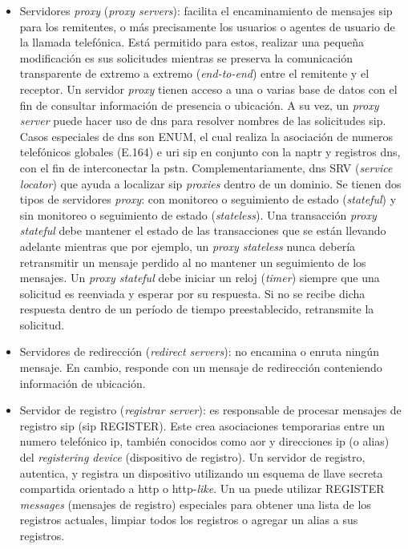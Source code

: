 \documentclass[a4paper,12pt]{report}
\begin{document}
\begin{itemize}
\item Servidores \emph{proxy} (\emph{proxy servers}):
facilita el encaminamiento de mensajes \ac{sip} para los
remitentes, o más precisamente los usuarios o agentes de usuario de la llamada
telefónica. Está permitido para estos, realizar una pequeña modificación es sus
solicitudes mientras se preserva la comunicación transparente de extremo a
extremo (\emph{end-to-end}) entre el remitente y el receptor. Un servidor \emph{proxy} tienen
acceso a una o varias base de datos con el fin de consultar información de
presencia o ubicación. A su vez, un \emph{proxy} \emph{server} puede hacer uso de \ac{dns} 
para resolver nombres de las solicitudes \ac{sip}. Casos especiales de
\ac{dns} son ENUM, el cual realiza la asociación de numeros telefónicos globales
(E.164) e \ac{uri} \ac{sip} en conjunto con la \ac{naptr} y registros \ac{dns}, con el fin de interconectar la \ac{pstn}.
Complementariamente, \ac{dns} SRV (\emph{service locator}) que ayuda a localizar \ac{sip} \emph{proxies} 
dentro de un dominio. 
Se tienen dos tipos de servidores \emph{proxy}: con monitoreo o seguimiento de estado
(\emph{stateful}) y sin monitoreo o seguimiento de estado (\emph{stateless}). Una transacción
\emph{proxy stateful} debe mantener el estado de las transacciones que se están
llevando adelante mientras que por ejemplo, un \emph{proxy stateless} nunca debería
retransmitir un mensaje perdido al no mantener un seguimiento de los mensajes.
Un \emph{proxy stateful} debe iniciar un reloj (\emph{timer}) siempre que una solicitud es
reenviada y esperar por su respuesta. Si no se recibe dicha respuesta dentro de
un período de tiempo preestablecido, retransmite la solicitud. 

\item Servidores de redirección (\emph{redirect servers}): no encamina o enruta ningún mensaje. En cambio,
responde con un mensaje de redirección conteniendo información de ubicación.

\item Servidor de registro (\emph{registrar server}):
es responsable de procesar mensajes de registro \ac{sip} (\ac{sip}
REGISTER). Este crea asociaciones temporarias entre un numero telefónico \ac{ip}, 
también conocidos como \ac{aor} y
direcciones \ac{ip} (o alias) del \emph{registering device} (dispositivo de registro). Un
servidor de registro, autentica, y registra un dispositivo utilizando un
esquema de llave secreta compartida orientado a \ac{http} o \ac{http}-\emph{like}.
Un \ac{ua} puede utilizar REGISTER \emph{messages} (mensajes de registro) especiales para obtener una
lista de los registros actuales, limpiar todos los registros o agregar un alias
a sus registros.
\end{itemize}
\end{document}
